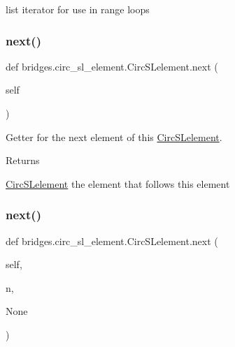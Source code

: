 list iterator for use in range loops 

\mbox{\label{classbridges_1_1circ__sl__element_1_1_circ_s_lelement_a5abc123aa4a20414a02785f3b1cc342a}} 
\subsubsection{\texorpdfstring{next()}{next()}\hspace{0.1cm}{\footnotesize\ttfamily [1/2]}}
{\footnotesize\ttfamily def bridges.\+circ\+\_\+sl\+\_\+element.\+Circ\+S\+Lelement.\+next (\begin{DoxyParamCaption}\item[{}]{self }\end{DoxyParamCaption})}



Getter for the next element of this \hyperlink{classbridges_1_1circ__sl__element_1_1_circ_s_lelement}{Circ\+S\+Lelement}. 

\begin{DoxyReturn}{Returns}


\hyperlink{classbridges_1_1circ__sl__element_1_1_circ_s_lelement}{Circ\+S\+Lelement} the element that follows this element 
\end{DoxyReturn}
\mbox{\label{classbridges_1_1circ__sl__element_1_1_circ_s_lelement_a0215303874e167e22f92e4adbdee1e84}} 
\subsubsection{\texorpdfstring{next()}{next()}\hspace{0.1cm}{\footnotesize\ttfamily [2/2]}}
{\footnotesize\ttfamily def bridges.\+circ\+\_\+sl\+\_\+element.\+Circ\+S\+Lelement.\+next (\begin{DoxyParamCaption}\item[{}]{self,  }\item[{}]{n,  }\item[{}]{None }\end{DoxyParamCaption})}



